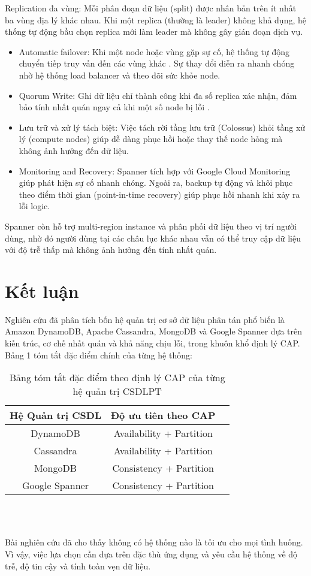 \documentclass[conference]{IEEEtran}
\begin{document}
Replication đa vùng: Mỗi phân đoạn dữ liệu (split) được nhân bản trên ít nhất ba vùng địa lý khác nhau. Khi một replica (thường là leader) không khả dụng, hệ thống tự động bầu chọn replica mới làm leader mà không gây gián đoạn dịch vụ.

\begin{itemize}
    \item Automatic failover: Khi một node hoặc vùng gặp sự cố, hệ thống tự động chuyển tiếp truy vấn đến các vùng khác \cite{gcp}. Sự thay đổi diễn ra nhanh chóng nhờ hệ thống load balancer và theo dõi sức khỏe node.
    \item Quorum Write: Ghi dữ liệu chỉ thành công khi đa số replica xác nhận, đảm bảo tính nhất quán ngay cả khi một số node bị lỗi \cite{gcp}.
    \item Lưu trữ và xử lý tách biệt: Việc tách rời tầng lưu trữ (Colossus) khỏi tầng xử lý (compute nodes) giúp dễ dàng phục hồi hoặc thay thế node hỏng mà không ảnh hưởng đến dữ liệu.
    \item Monitoring and Recovery: Spanner tích hợp với Google Cloud Monitoring giúp phát hiện sự cố nhanh chóng. Ngoài ra, backup tự động và khôi phục theo điểm thời gian (point-in-time recovery) giúp phục hồi nhanh khi xảy ra lỗi logic.
\end{itemize}
Spanner còn hỗ trợ multi-region instance và phân phối dữ liệu theo vị trí người dùng, nhờ đó người dùng tại các châu lục khác nhau vẫn có thể truy cập dữ liệu với độ trễ thấp mà không ảnh hưởng đến tính nhất quán.

\section{Kết luận}
Nghiên cứu đã phân tích bốn hệ quản trị cơ sở dữ liệu phân tán phổ biến là Amazon DynamoDB, Apache Cassandra, MongoDB và Google Spanner dựa trên kiến trúc, cơ chế nhất quán và khả năng chịu lỗi, trong khuôn khổ định lý CAP. Bảng 1 tóm tắt đặc điểm chính của từng hệ thống:\\
\begin{table}[h]
    \centering
    \begin{tabular}{|c|c|c|}
    \hline  
    \textbf{Hệ Quản trị CSDL} &\textbf{Độ ưu tiên theo CAP}  \\
    \hline
    DynamoDB&  Availability + Partition \\
    \hline
    Cassandra&  Availability + Partition  \\
    \hline
    MongoDB&  Consistency + Partition \\
    \hline
    Google Spanner& Consistency + Partition  \\
    \hline
    \end{tabular}
    \\
    \caption{Bảng tóm tắt đặc điểm theo định lý CAP của từng hệ quản trị CSDLPT}
    \label{tab:my_label}
\end{table}
\\
Bài nghiên cứu đã cho thấy không có hệ thống nào là tối ưu cho mọi tình huống. Vì vậy, việc lựa chọn cần dựa trên đặc thù ứng dụng và yêu cầu hệ thống về độ trễ, độ tin cậy và tính toàn vẹn dữ liệu.





\end{document}
